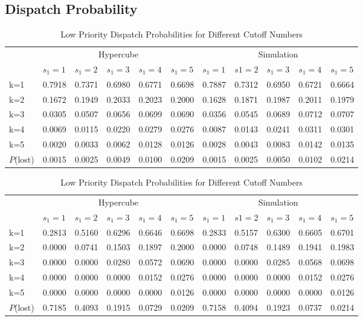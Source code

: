 \documentclass{article}
\begin{document}
\subsection{Dispatch Probability}

\begin{table}
\centering
\begin{tabular}{| l || l l l l l | l l l l l |}
\hline
\hline
& \multicolumn{5}{c|}{Hypercube} & \multicolumn{5}{c|}{Simulation}\\
& $s_1=1$ & $ s_1= 2$ & $s_1=3$ & $s_1=4$ & $s_1=5$& $s_1=1$ & $ s1= 2$ & $s_1=3$ & $s_1=4$ & $s_1=5$  \\
 \hline
k=1 &0.7918&0.7371&0.6980&0.6771&0.6698&0.7887&0.7312&0.6950&0.6721&0.6664  \\
k=2 &0.1672&0.1949&0.2033&0.2023&0.2000&0.1628&0.1871&0.1987&0.2011&0.1979  \\
k=3 &0.0305&0.0507&0.0656&0.0699&0.0690&0.0356&0.0545&0.0689&0.0712&0.0707  \\
k=4 &0.0069&0.0115&0.0220&0.0279&0.0276&0.0087&0.0143&0.0241&0.0311&0.0301  \\
k=5 &0.0020&0.0033&0.0062&0.0128&0.0126&0.0028&0.0043&0.0083&0.0142&0.0135  \\
\hline
$P$(lost) &0.0015&0.0025&0.0049&0.0100&0.0209&0.0015&0.0025&0.0050&0.0102&0.0214 \\
\hline
\end{tabular}
\label{table:dispatchprobH}
\caption{High Priority Dispatch Probabilities for Different Cutoff Numbers}

\vspace{10mm}

\centering
\begin{tabular}{| l || l l l l l | l l l l l |}
\hline
\hline
& \multicolumn{5}{c|}{Hypercube} & \multicolumn{5}{c|}{Simulation}\\
& $s_1=1$ & $ s_1= 2$ & $s_1=3$ & $s_1=4$ & $s_1=5$& $s_1=1$ & $ s1= 2$ & $s_1=3$ & $s_1=4$ & $s_1=5$  \\ 
\hline
k=1 &0.2813&0.5160&0.6296&0.6646&0.6698&0.2833&0.5157&0.6300&0.6605&0.6701  \\
k=2 &0.0000&0.0741&0.1503&0.1897&0.2000&0.0000&0.0748&0.1489&0.1941&0.1983  \\
k=3 &0.0000&0.0000&0.0280&0.0572&0.0690&0.0000&0.0000&0.0285&0.0568&0.0698  \\
k=4 &0.0000&0.0000&0.0000&0.0152&0.0276&0.0000&0.0000&0.0000&0.0152&0.0276  \\
k=5 &0.0000&0.0000&0.0000&0.0000&0.0126&0.0000&0.0000&0.0000&0.0000&0.0126  \\
\hline
$P$(lost) &0.7185&0.4093&0.1915&0.0729&0.0209&0.7158&0.4094&0.1923&0.0737&0.0214 \\
\hline
\end{tabular}
\label{table:dispatchprobL}
\caption{Low Priority Dispatch Probabilities for Different Cutoff Numbers}


\end{table}
\end{document}
